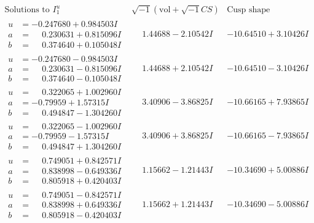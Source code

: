 \documentclass[1p]{elsarticle_modified}
\theoremstyle{definition}
\newcommand{\I}{\sqrt{-1}}
\begin{document}
$$\begin{array}{c|c|c}  
\text{Solutions to }I^u_{1}& \I (\text{vol} + \sqrt{-1}CS) & \text{Cusp shape}\\
 \hline 
\begin{aligned}
u &= -0.247680 + 0.984503 I \\
a &= \phantom{-}0.230631 + 0.815096 I \\
b &= \phantom{-}0.374640 + 0.105048 I\end{aligned}
 & \phantom{-}1.44688 - 2.10542 I & -10.64510 + 3.10426 I \\ \hline\begin{aligned}
u &= -0.247680 - 0.984503 I \\
a &= \phantom{-}0.230631 - 0.815096 I \\
b &= \phantom{-}0.374640 - 0.105048 I\end{aligned}
 & \phantom{-}1.44688 + 2.10542 I & -10.64510 - 3.10426 I \\ \hline\begin{aligned}
u &= \phantom{-}0.322065 + 1.002960 I \\
a &= -0.79959 + 1.57315 I \\
b &= \phantom{-}0.494847 - 1.304260 I\end{aligned}
 & \phantom{-}3.40906 - 3.86825 I & -10.66165 + 7.93865 I \\ \hline\begin{aligned}
u &= \phantom{-}0.322065 - 1.002960 I \\
a &= -0.79959 - 1.57315 I \\
b &= \phantom{-}0.494847 + 1.304260 I\end{aligned}
 & \phantom{-}3.40906 + 3.86825 I & -10.66165 - 7.93865 I \\ \hline\begin{aligned}
u &= \phantom{-}0.749051 + 0.842571 I \\
a &= \phantom{-}0.838998 - 0.649336 I \\
b &= \phantom{-}0.805918 + 0.420403 I\end{aligned}
 & \phantom{-}1.15662 - 1.21443 I & -10.34690 + 5.00886 I \\ \hline\begin{aligned}
u &= \phantom{-}0.749051 - 0.842571 I \\
a &= \phantom{-}0.838998 + 0.649336 I \\
b &= \phantom{-}0.805918 - 0.420403 I\end{aligned}
 & \phantom{-}1.15662 + 1.21443 I & -10.34690 - 5.00886 I \\ \hline\begin{aligned}

\end{aligned}
\end{array}$$
\end{document}

